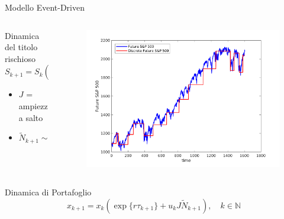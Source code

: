 \begin{frame}{Modello Event-Driven}
	\begin{columns}
		\begin{column}{.5\textwidth}
			\begin{block}{Dinamica del titolo rischioso}
				\begin{equation*}
				S_{k+1} = S_k(1+J\widetilde{N}_{k+1}), \quad k \in \mathbb{N}
				\end{equation*}
			\end{block}
			\begin{itemize}
				\item $J$ = ampiezza salto
				\item $\widetilde{N}_{k+1} \sim B(p)$
			\end{itemize}
		\end{column}
		\begin{column}{.5\textwidth}
			\begin{figure}
				\centering
				\includegraphics[width=1\linewidth]{Images/DiscreteDynamics}
			\end{figure}
		\end{column}
	\end{columns}
	\pause
	\begin{block}{Dinamica di Portafoglio}
		\begin{equation*}
		x_{k+1} = x_k(\exp\{r \tau_{k+1} \} + u_kJ\widetilde{N}_{k+1}), \quad k \in \mathbb{N}
		\end{equation*}
	\end{block}
	
\end{frame}






